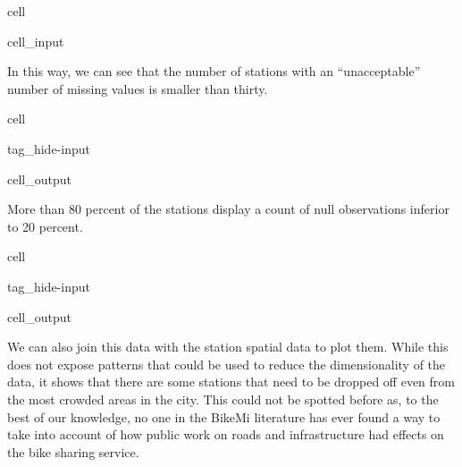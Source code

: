\documentclass[letterpaper,10pt,english]{jupyterBook}
\begin{document}
\begin{sphinxuseclass}{cell}
\begin{sphinxuseclass}{cell_input}
\begin{sphinxVerbatim}[commandchars=\\\{\}]
\PYG{p}{[}\PYG{p}{]}  
    \PYG{p}{[}\PYG{p}{]}  
\end{sphinxVerbatim}

\end{sphinxuseclass}
\end{sphinxuseclass}
\sphinxAtStartPar
In this way, we can see that the number of stations with an “unacceptable” number of missing values is smaller than thirty.

\begin{sphinxuseclass}{cell}
\begin{sphinxuseclass}{tag_hide-input}
\begin{sphinxuseclass}{cell_output}
\noindent{}

\end{sphinxuseclass}
\end{sphinxuseclass}
\end{sphinxuseclass}
\sphinxAtStartPar
More than 80 percent of the stations display a count of null observations inferior to 20 percent.

\begin{sphinxuseclass}{cell}
\begin{sphinxuseclass}{tag_hide-input}
\begin{sphinxuseclass}{cell_output}
\noindent{}

\end{sphinxuseclass}
\end{sphinxuseclass}
\end{sphinxuseclass}
\sphinxAtStartPar
We can also join this data with the station spatial data to plot them. While this does not expose patterns that could be used to reduce the dimensionality of the data, it shows that there are some stations that need to be dropped off even from the most crowded areas in the city. This could not be spotted before as, to the best of our knowledge, no one in the BikeMi literature has ever found a way to take into account of how public work on roads and infrastructure had effects on the bike sharing service.
\end{document}
